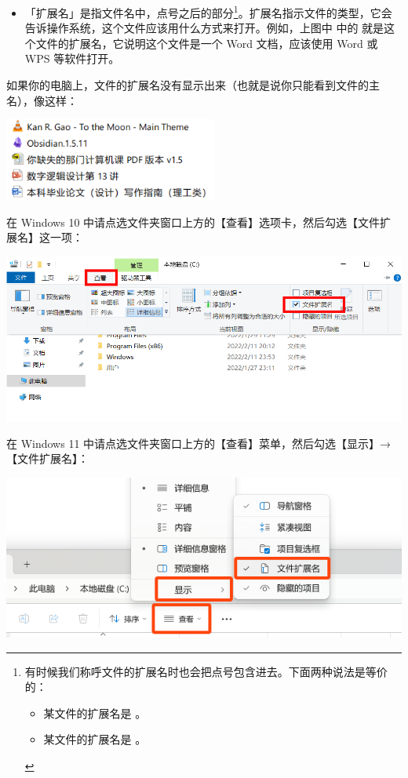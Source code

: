 \begin{itemize}
  \item 「扩展名」是指文件名中，点号之后的部分\cprotect\footnote{有时候我们称呼文件的扩展名时也会把点号包含进去。下面两种说法是等价的：
    \begin{itemize}
      \item 某文件的扩展名是 。
      \item 某文件的扩展名是 。
    \end{itemize}
  }。扩展名指示文件的类型，它会告诉操作系统，这个文件应该用什么方式来打开。例如，上图中  中的  就是这个文件的扩展名，它说明这个文件是一个 Word 文档，应该使用 Word 或 WPS 等软件打开。
\end{itemize}

\begin{note}
  如果你的电脑上，文件的扩展名没有显示出来（也就是说你只能看到文件的主名），像这样：

  \begin{center}
    \includegraphics[width=7cm]{assets/basic/5_files_not_showing_extensions.png}
    \label{fig:5_files_not_showing_extensions}
  \end{center}

  在 Windows 10 中请点选文件夹窗口上方的【查看】选项卡，然后勾选【文件扩展名】这一项：

  \begin{center}
    \includegraphics[width=.6\textwidth]{assets/basic/Windows_10_set_full_filename.png}
    \label{fig:Windows_10_set_full_filename}
  \end{center}

  在 Windows 11 中请点选文件夹窗口上方的【查看】菜单，然后勾选【显示】→【文件扩展名】：

  \begin{center}
    \includegraphics[width=.6\textwidth]{assets/basic/Windows_11_set_full_filename.png}
    \label{fig:Windows_11_set_full_filename}
  \end{center}
\end{note}

